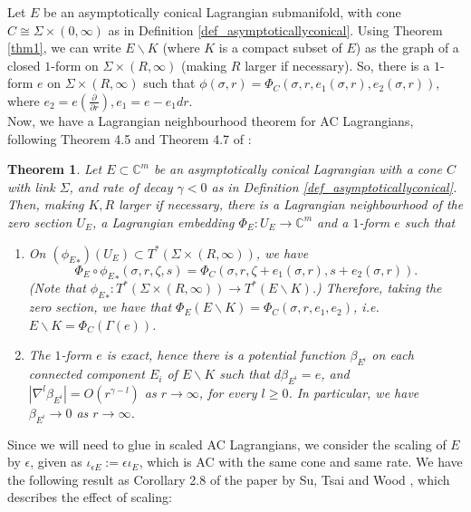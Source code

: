 \documentclass[10pt, a4paper]{article}
\theoremstyle{plain}%
\newtheorem{theorem}{Theorem}[section]
\theoremstyle{definition}
\numberwithin{figure}{section}
\numberwithin{equation}{section}
\begin{document}
Let $E$ be an asymptotically conical Lagrangian submanifold, with cone $C\cong\Sigma\times (0,\infty)$ as in Definition \ref{def_asymptoticallyconical}. Using Theorem \ref{thm1}, we can write $E\backslash K$ (where $K$ is a compact subset of $E$) as the graph of a closed $1$-form on $\Sigma \times (R,\infty)$ (making $R$ larger if necessary). So, there is a $1$-form $e$ on $\Sigma\times (R,\infty)$ such that $\phi(\sigma,r) = \Phi_C (\sigma, r, e_1(\sigma, r), e_2(\sigma, r))$, where $e_2 = e(\frac{\partial}{\partial r}), e_1 = e - e_1dr$.
\\

Now, we have a Lagrangian neighbourhood theorem for AC Lagrangians, following Theorem 4.5 and Theorem 4.7 of \cite{Joy04}:

\begin{theorem}\label{thm2}
	Let $E\subset \mathbb{C}^m$ be an asymptotically conical Lagrangian with a cone $C$ with link $\Sigma$, and rate of decay $\gamma<0$ as in Definition \ref{def_asymptoticallyconical}. Then, making $K,R$ larger if necessary, there is a Lagrangian neighbourhood of the zero section $U_E$, a Lagrangian embedding $\Phi_E: U_E \rightarrow \mathbb{C}^m$ and a $1$-form $e$ such that 
	
	\begin{enumerate}
		
		\item On $({\phi_E}_*)(U_E)\subset T^*(\Sigma\times (R,\infty))$, we have  \[
		\Phi_E \circ {\phi_E}_*(\sigma, r, \zeta, s) = \Phi_C (\sigma, r, \zeta + e_1(\sigma,r), s + e_2(\sigma, r)).
		\]
		(Note that ${\phi_{E}}_*  : T^*(\Sigma\times(R,\infty)) \rightarrow T^*(E\backslash K)$.) Therefore, taking the zero section, we have that $\Phi_E(E\backslash K) = \Phi_C(\sigma,r,e_1,e_2)$, i.e. $E\backslash K = \Phi_C(\Gamma(e))$.
		\item The $1$-form $e$ is exact, hence there is a potential function $\beta_{E^i}$ on each connected component $E_i$ of $E\backslash K$ such that $d\beta_{E^i} = e$, and $|\nabla^l \beta_{E^i}| = O(r^{\gamma-l})$ as $r\rightarrow \infty$, for every $l\geq 0$. In particular, we have $\beta_{E^i} \rightarrow 0$ as $r\rightarrow \infty$.
		
	\end{enumerate}
\end{theorem}

Since we will need to glue in scaled AC Lagrangians, we consider the scaling of $E$ by $\epsilon$, given as $\iota_{\epsilon E} := \epsilon \iota_E$, which is AC with the same cone and same rate. We have the following result as Corollary 2.8 of the paper by Su, Tsai and Wood \cite{STW24}, which describes the effect of scaling:
\end{document}
